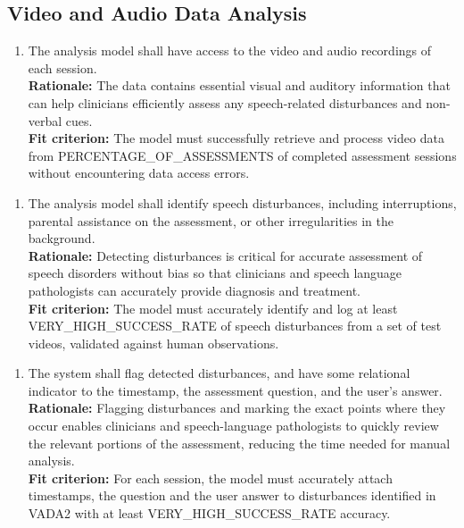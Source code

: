 \documentclass[12pt]{article}
\begin{document}
\subsection{Video and Audio Data Analysis}
\begin{enumerate}[label={FR-VADA}1. ]
  \item The analysis model shall have access to the video and audio recordings of each session.\\
  \textbf{Rationale: }The data contains essential visual and auditory information that can help clinicians 
  efficiently assess any speech-related disturbances and non-verbal cues.\\
  \textbf{Fit criterion: }The model must successfully retrieve and process video data from PERCENTAGE\_OF\_ASSESSMENTS of 
  completed assessment sessions without encountering data access errors.
\end{enumerate}
\begin{enumerate}[label={FR-VADA}2. ]
  \item The analysis model shall identify speech disturbances, including interruptions, parental 
  assistance on the assessment, or other irregularities in the background.\\
  \textbf{Rationale: }Detecting disturbances is critical for accurate assessment of speech disorders without 
  bias so that clinicians and speech language pathologists can accurately provide diagnosis and treatment.\\
  \textbf{Fit criterion: }The model must accurately identify and log at least VERY\_HIGH\_SUCCESS\_RATE of speech disturbances 
  from a set of test videos, validated against human observations.
\end{enumerate}
\begin{enumerate}[label={FR-VADA}3. ]
  \item The system shall flag detected disturbances, and have some relational indicator to the timestamp, the assessment question, and the user's answer.\\
  \textbf{Rationale: }Flagging disturbances and marking the exact points where they occur enables clinicians and 
  speech-language pathologists to quickly review the relevant portions of the assessment, reducing the time needed 
  for manual analysis.\\
  \textbf{Fit criterion: }For each session, the model must accurately attach timestamps, the question and the user answer to disturbances
  identified in VADA2 with at least VERY\_HIGH\_SUCCESS\_RATE accuracy.
\end{enumerate}
\end{document}
